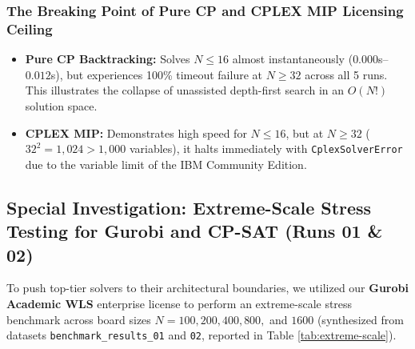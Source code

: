 \documentclass[a4paper,11pt]{article}
\begin{document}
\subsubsection{The Breaking Point of Pure CP and CPLEX MIP Licensing Ceiling}
\begin{itemize}
    \item \textbf{Pure CP Backtracking:} Solves $N \le 16$ almost instantaneously ($0.000$s--$0.012$s), but experiences 100\% timeout failure at $N \ge 32$ across all 5 runs. This illustrates the collapse of unassisted depth-first search in an $O(N!)$ solution space.
    \item \textbf{CPLEX MIP:} Demonstrates high speed for $N \le 16$, but at $N \ge 32$ ($32^2 = 1,024 > 1,000$ variables), it halts immediately with \texttt{CplexSolverError} due to the variable limit of the IBM Community Edition.
\end{itemize}

\subsection{Special Investigation: Extreme-Scale Stress Testing for Gurobi and CP-SAT (Runs 01 \& 02)}

To push top-tier solvers to their architectural boundaries, we utilized our \textbf{Gurobi Academic WLS} enterprise license to perform an extreme-scale stress benchmark across board sizes $N = 100, 200, 400, 800,$ and $1600$ (synthesized from datasets \texttt{benchmark\_results\_01} and \texttt{02}, reported in Table \ref{tab:extreme-scale}).

\begin{table}[t]
\centering
\footnotesize
\setlength{\tabcolsep}{5pt}
\caption{Extreme-scale stress testing: Solve time (seconds) at dimensions $N \ge 100$}
\label{tab:extreme-scale}
\end{table}
\end{document}
